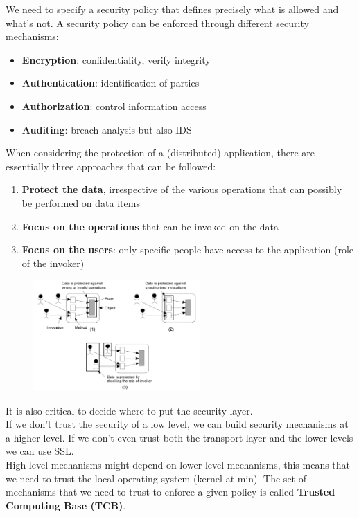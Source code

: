 \documentclass[10pt,a4paper]{article}
\begin{document}
We need to specify a security policy that defines precisely what is allowed and what's not. A security policy can be enforced through different security mechanisms:
\begin{itemize}
	\item \textbf{Encryption}: confidentiality, verify integrity
	\item \textbf{Authentication}: identification of parties
	\item \textbf{Authorization}: control information access
	\item \textbf{Auditing}: breach analysis but also IDS
\end{itemize} \pagebreak
When considering the protection of a (distributed) application, there are essentially three approaches that can be followed:
\begin{enumerate}
	\item \textbf{Protect the data}, irrespective of the various operations that can possibly be performed on data items
	\item \textbf{Focus on the operations} that can be invoked on the data
	\item \textbf{Focus on the users}: only specific people have access to the application (role of the invoker)
\end{enumerate}
\begin{figure}[h!]\hfill \includegraphics[width=180pt]{images/security-approaches.png}\hspace*{\fill}
  \label{fig:security-approaches}
\end{figure} 
It is also critical to decide where to put the security layer. \\
If we don't trust the security of a low level, we can build security mechanisms at a higher level. If we don't even trust both the transport layer and the lower levels we can use SSL. \\
High level mechanisms might depend on lower level mechanisms, this means that we need to trust the local operating system (kernel at min). The set of mechanisms that we need to trust to enforce a given policy is called \textbf{Trusted Computing Base (TCB)}.
\end{document}
